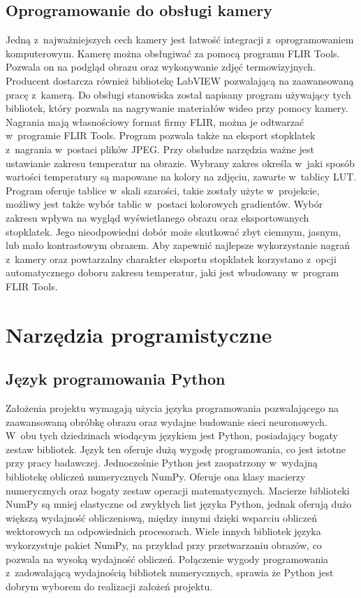 \subsection{Oprogramowanie do obsługi kamery}
\label{subsec:camera_soft}
Jedną z~najważniejszych cech kamery jest łatwość integracji
z~oprogramowaniem komputerowym.
Kamerę można obsługiwać za pomocą programu FLIR Tools.
Pozwala on na podgląd obrazu oraz wykonywanie zdjęć termowizyjnych.
Producent dostarcza również bibliotekę LabVIEW pozwalającą na zaawansowaną
pracę z~kamerą.
Do obsługi stanowiska został napisany program używający tych bibliotek,
który pozwala na nagrywanie materiałów wideo przy pomocy kamery.
Nagrania mają własnościowy format firmy FLIR, można je odtwarzać w~programie
FLIR Tools.
Program pozwala także na eksport stopklatek z~nagrania w~postaci plików JPEG.
Przy obsłudze narzędzia ważne jest ustawianie zakresu temperatur na obrazie.
Wybrany zakres określa w~jaki sposób wartości temperatury są mapowane na
kolory na zdjęciu, zawarte w~tablicy LUT.
Program oferuje tablice w~skali szarości, takie zostały użyte w~projekcie,
możliwy jest także wybór tablic w~postaci kolorowych gradientów.
Wybór zakresu wpływa na wygląd wyświetlanego obrazu oraz eksportowanych
stopklatek.
Jego nieodpowiedni dobór może skutkować zbyt ciemnym, jasnym, lub mało
kontrastowym obrazem.
Aby zapewnić najlepsze wykorzystanie nagrań z~kamery oraz powtarzalny
charakter eksportu stopklatek korzystano z~opcji automatycznego doboru
zakresu temperatur, jaki jest wbudowany w~program FLIR Tools.

\section{Narzędzia programistyczne}

\subsection{Język programowania Python}
Założenia projektu wymagają użycia języka programowania pozwalającego
na zaawansowaną obróbkę obrazu oraz wydajne budowanie sieci neuronowych.
W~obu tych dziedzinach wiodącym językiem jest Python, posiadający bogaty
zestaw bibliotek.
Język ten oferuje dużą wygodę programowania, co jest istotne przy pracy 
badawczej.
Jednocześnie Python jest zaopatrzony w~wydajną bibliotekę obliczeń
numerycznych NumPy.
Oferuje ona klasy macierzy numerycznych oraz bogaty zestaw operacji
matematycznych.
Macierze biblioteki NumPy są mniej elastyczne od zwykłych list języka Python,
jednak oferują dużo większą wydajność obliczeniową, między innymi dzięki
wsparciu obliczeń wektorowych na odpowiednich procesorach.
Wiele innych bibliotek języka wykorzystuje pakiet NumPy, na przykład przy
przetwarzaniu obrazów, co pozwala na wysoką wydajność obliczeń.
Połączenie wygody programowania z~zadowalającą wydajnością bibliotek
numerycznych, sprawia że Python jest dobrym wyborem do realizacji
założeń projektu.

